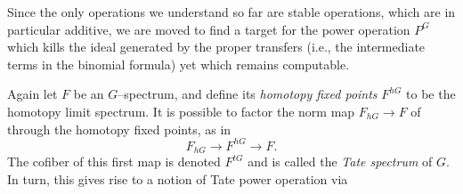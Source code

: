 Since the only operations we understand so far are stable operations, which are in particular additive, we are moved to find a target for the power operation \(P^G\) which kills the ideal generated by the proper transfers (i.e., the intermediate terms in the binomial formula) yet which remains computable.

\begin{definition}
Again let \(F\) be an \(G\)--spectrum, and define its \textit{homotopy fixed points} \(F^{hG}\) to be the homotopy limit spectrum.  It is possible to factor the norm map \(F_{hG} \to F\) of  through the homotopy fixed points, as in \[F_{hG} \to F^{hG} \to F.\]  The cofiber of this first map is denoted \(F^{tG}\) and is called the \textit{Tate spectrum} of \(G\).  In turn, this gives rise to a notion of Tate power operation via
\begin{center}
\end{center}
\end{definition}

